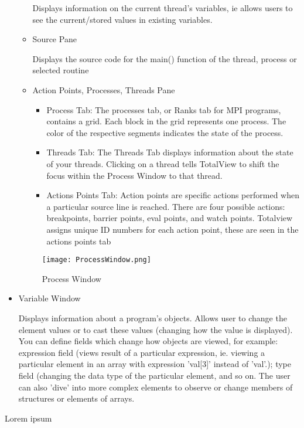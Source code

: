 \documentclass{article}
\begin{document}
\begin{itemize}
\begin{itemize}
		Displays information on the current thread's variables, ie allows users to see the current/stored values in existing variables.
		\item Source Pane
		
		Displays the source code for the main() function of the thread, process or selected routine
		\item Action Points, Processes, Threads Pane
		\begin{itemize}
		\item Process Tab: The processes tab, or Ranks tab for MPI programs, contains a grid. Each block in the grid represents one process. The color of the respective segments indicates the state of the process. 
		\item Threads Tab: The Threads Tab displays information about the state of your threads. Clicking on a thread tells TotalView to shift the focus within the Process Window to that thread.
		\item Actions Points Tab: Action points are specific actions performed when a particular source line is reached. There are four possible actions: breakpoints, barrier points, eval points, and watch points. Totalview assigns unique ID numbers for each action point, these are seen in the actions points tab
		\end{itemize}
	\end{itemize}
	\begin{figure}[p] %
			\texttt{[image: ProcessWindow.png]}
		\caption{Process Window}
		\label{fig:proc_window}
	\end{figure}
	\item Variable Window
	
	Displays information about a program's objects. Allows user to change the element values or to cast these values (changing how the value is displayed). You can define fields which change how objects are viewed, for example: expression field (views result of a particular expression, ie. viewing a particular element in an array with expression 'val[3]' instead of 'val'.); type field (changing the data type of the particular element, and so on. The user can also 'dive' into more complex elements to observe or change members of structures or elements of arrays.
	
\end{itemize}
Lorem ipsum
\end{document}
